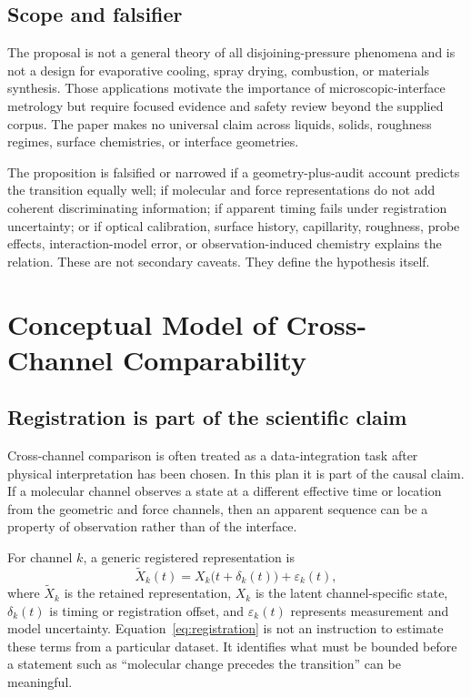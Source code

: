 \documentclass[conference]{IEEEtran}
\begin{document}
\subsection{Scope and falsifier}

The proposal is not a general theory of all disjoining-pressure phenomena and is not a design for evaporative cooling, spray drying, combustion, or materials synthesis. Those applications motivate the importance of microscopic-interface metrology but require focused evidence and safety review beyond the supplied corpus. The paper makes no universal claim across liquids, solids, roughness regimes, surface chemistries, or interface geometries.

The proposition is falsified or narrowed if a geometry-plus-audit account predicts the transition equally well; if molecular and force representations do not add coherent discriminating information; if apparent timing fails under registration uncertainty; or if optical calibration, surface history, capillarity, roughness, probe effects, interaction-model error, or observation-induced chemistry explains the relation. These are not secondary caveats. They define the hypothesis itself.

\section{Conceptual Model of Cross-Channel Comparability}

\subsection{Registration is part of the scientific claim}

Cross-channel comparison is often treated as a data-integration task after physical interpretation has been chosen. In this plan it is part of the causal claim. If a molecular channel observes a state at a different effective time or location from the geometric and force channels, then an apparent sequence can be a property of observation rather than of the interface.

For channel $k$, a generic registered representation is
\begin{equation}
\widetilde{X}_{k}(t)=X_{k}\bigl(t+\delta_{k}(t)\bigr)+\varepsilon_{k}(t),
\label{eq:registration}
\end{equation}
where $\widetilde{X}_{k}$ is the retained representation, $X_{k}$ is the latent channel-specific state, $\delta_{k}(t)$ is timing or registration offset, and $\varepsilon_{k}(t)$ represents measurement and model uncertainty. Equation~\eqref{eq:registration} is not an instruction to estimate these terms from a particular dataset. It identifies what must be bounded before a statement such as ``molecular change precedes the transition'' can be meaningful.
\end{document}
